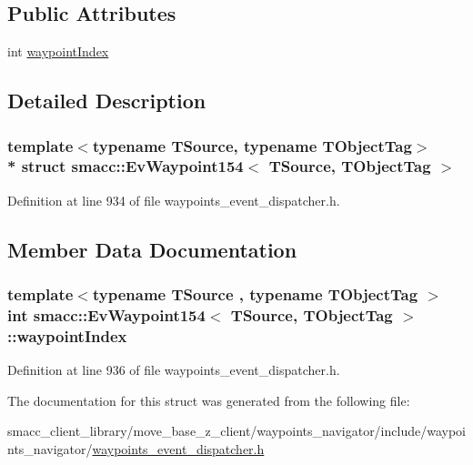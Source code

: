 \subsection*{Public Attributes}
\begin{DoxyCompactItemize}
\item 
int \hyperlink{structsmacc_1_1EvWaypoint154_aa6f94b7113e37930287850842d51ecce}{waypoint\+Index}
\end{DoxyCompactItemize}


\subsection{Detailed Description}
\subsubsection*{template$<$typename T\+Source, typename T\+Object\+Tag$>$\\*
struct smacc\+::\+Ev\+Waypoint154$<$ T\+Source, T\+Object\+Tag $>$}



Definition at line 934 of file waypoints\+\_\+event\+\_\+dispatcher.\+h.



\subsection{Member Data Documentation}
\subsubsection[{\texorpdfstring{waypoint\+Index}{waypointIndex}}]{\setlength{\rightskip}{0pt plus 5cm}template$<$typename T\+Source , typename T\+Object\+Tag $>$ int {\bf smacc\+::\+Ev\+Waypoint154}$<$ T\+Source, T\+Object\+Tag $>$\+::waypoint\+Index}\hypertarget{structsmacc_1_1EvWaypoint154_aa6f94b7113e37930287850842d51ecce}{}\label{structsmacc_1_1EvWaypoint154_aa6f94b7113e37930287850842d51ecce}


Definition at line 936 of file waypoints\+\_\+event\+\_\+dispatcher.\+h.



The documentation for this struct was generated from the following file\+:\begin{DoxyCompactItemize}
\item 
smacc\+\_\+client\+\_\+library/move\+\_\+base\+\_\+z\+\_\+client/waypoints\+\_\+navigator/include/waypoints\+\_\+navigator/\hyperlink{waypoints__event__dispatcher_8h}{waypoints\+\_\+event\+\_\+dispatcher.\+h}\end{DoxyCompactItemize}
